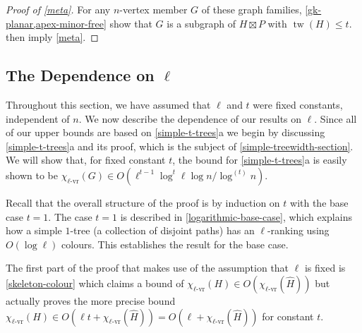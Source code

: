 \documentclass[kpfonts]{patmorin}
\DeclareMathOperator{\tw}{tw}
\newcommand{\rn}[1]{\chi_{\operatorname{#1-vr}}}
\newcommand{\lrn}{\rn{\ell}}
\theoremstyle{named}
\newcommand{\weirdref}[2]{\cref{#1}#2}
\begin{document}
\begin{proof}[Proof of \cref{meta}]
    For any $n$-vertex member $G$ of these graph families, \cref{gk-planar,apex-minor-free} show that $G$ is a subgraph of $H\boxtimes P$ with $\tw(H)\le t$.   then imply \cref{meta}.
\end{proof}

\subsection{The Dependence on $\ell$}
\label{dependence-on-ell}

Throughout this section, we have assumed that $\ell$ and $t$ were fixed constants, independent of $n$.  We now describe the dependence of our results on $\ell$.  Since all of our upper bounds are based on \weirdref{simple-t-trees}{a} we begin by discussing \weirdref{simple-t-trees}{a} and its proof, which is the subject of \cref{simple-treewidth-section}.  We will show that, for fixed constant $t$, the bound for \weirdref{simple-t-trees}{a} is easily shown to be $\lrn(G)\in O(\ell^{t-1}\log^t\ell \log n/\log^{(t)} n)$.

Recall that the overall structure of the proof is by induction on $t$ with the base case $t=1$.  The case $t=1$ is described in \cref{logarithmic-base-case}, which explains how a simple $1$-tree (a collection of disjoint paths) has an $\ell$-ranking using $O(\log\ell)$ colours.  This establishes the result for the base case.

The first part of the proof that makes use of the assumption that $\ell$ is fixed is \cref{skeleton-colour} which claims a bound of $\lrn(H)\in O(\lrn(\hat{H}))$ but actually proves the more precise bound $\lrn(H)\in O(\ell t+ \lrn(\hat{H}))=O(\ell+\lrn(\hat{H}))$ for constant $t$.
\end{document}
